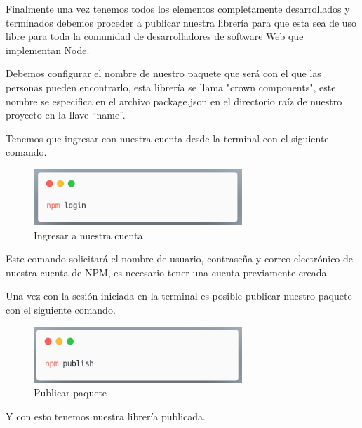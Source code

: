Finalmente una vez tenemos todos los elementos completamente desarrollados y terminados debemos proceder a publicar nuestra librería para que esta sea de uso libre para toda la comunidad de desarrolladores de software Web que implementan Node.

Debemos configurar el nombre de nuestro paquete que será con el que las personas pueden encontrarlo, esta librería se llama "crown components", este nombre se especifica en el archivo package.json en el directorio raíz de nuestro proyecto en la llave “name”.

Tenemos que ingresar con nuestra cuenta desde la terminal con el siguiente comando.
  \newline
    \begin{figure}[H]
    \centering
    \includegraphics[width=0.7\textwidth]{./Imagenes/8.39.png}
    \caption[ingresar a nuestra cuenta]{Ingresar a nuestra cuenta}
    \end{figure}
    
    Este comando solicitará el nombre de usuario, contraseña y correo electrónico de nuestra cuenta de NPM, es necesario tener una cuenta previamente creada.

Una vez con la sesión iniciada en la terminal es posible publicar nuestro paquete con el siguiente comando.
  \newline
    \begin{figure}[H]
    \centering
    \includegraphics[width=0.7\textwidth]{./Imagenes/8.40.png}
    \caption[Publicar paquete]{Publicar paquete}
    \end{figure}
        Y con esto tenemos nuestra librería publicada.
    \clearpage
    
